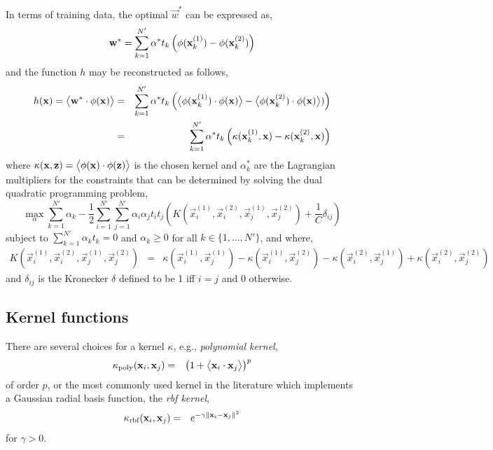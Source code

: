 In terms of training data, the optimal $\vec{w}^*$ can be expressed as, 
\begin{equation}
	\mathbf{w}^*=\sum_{k=1}^{N'} \alpha^* t_k \left( {\mathbf{\phi}}(\mathbf{x}_k^{(1)})-{\mathbf{\phi}}(\mathbf{x}_k^{(2)}) \right)
\end{equation}
and the function $h$ may be reconstructed as follows,
\begin{eqnarray}\label{eq:nonlinear}
	h(\vec{x})=\inner{\vec{w}^*}{\vphi(\vec{x})} &=& 
	\sum_{k=1}^{N'} \alpha^* t_k \left( \inner{\vphi(\vec{x}_k^{(1)})}{\vphi(\vec{x})}-\inner{\vphi(\vec{x}_k^{(2)})}{\vphi(\vec{x})} ) \right) \nonumber \\ 
	&=&\sum_{k=1}^{N'} \alpha^* t_k \left( \kappa(\vec{x}_k^{(1)},\vec{x})-\kappa(\vec{x}_k^{(2)},\vec{x}) \right)
\end{eqnarray}
where $\kappa(\mathbf{x},\mathbf{z})=\big<{{\mathbf{\phi}}(\mathbf{x})}\cdot{{\mathbf{\phi}}(\mathbf{z})}\big>$ is the chosen kernel and $\alpha_k^*$ are the Lagrangian multi\-pliers for the constraints that can be determined by solving the dual quadratic programming problem,
\begin{equation}\label{eq:margin:nonlinear}
	\max_{\alpha} \sum_{k=1}^{N'} \alpha_k -\frac{1}{2} \sum_{i=1}^{N'}\sum_{j=1}^{N'} \alpha_i\alpha_jt_it_j\left(K(\vec{x}_i^{(1)},\vec{x}_i^{(2)},\vec{x}_j^{(1)},\vec{x}_j^{(2)}) +\frac{1}{C}\delta_{ij}\right)
\end{equation} 
subject to $\sum_{k=1}^{N'} \alpha_kt_k=0$ and $\alpha_k\geq0$ for all $k\in\{1,\ldots,N'\}$, and where,
\begin{eqnarray*}
	K(\vec{x}_i^{(1)},\vec{x}_i^{(2)},\vec{x}_j^{(1)},\vec{x}_j^{(2)})  &=& 
	\kappa(\vec{x}_i^{(1)},\vec{x}_j^{(1)})-\kappa(\vec{x}_i^{(1)},\vec{x}_j^{(2)})-\kappa(\vec{x}_i^{(2)},\vec{x}_j^{(1)})+\kappa(\vec{x}_i^{(2)},\vec{x}_j^{(2)})
\end{eqnarray*}
and $\delta_{ij}$ is the Kronecker $\delta$ defined to be 1 iff $i=j$ and 0 otherwise.

\subsection*{Kernel functions}
There are several choices for a kernel $\kappa$, e.g., \emph{polynomial kernel},
\begin{eqnarray}
	\kappa_{\text{poly}}(\mathbf{x}_i,\mathbf{x}_j)&=& \left(1+\big<{\mathbf{x}_i}\cdot{\mathbf{x}_j}\big> \right)^p
\end{eqnarray}
of order $p$, or the most commonly used kernel in the literature which implements a Gauss\-ian radial basis function, the \emph{rbf kernel},
\begin{eqnarray}
	\kappa_{\text{rbf}}(\mathbf{x}_i,\mathbf{x}_j)&=& e^{-\gamma \lVert\mathbf{x}_i-\mathbf{x}_j\rVert^2}
\end{eqnarray}
for $\gamma>0$.

